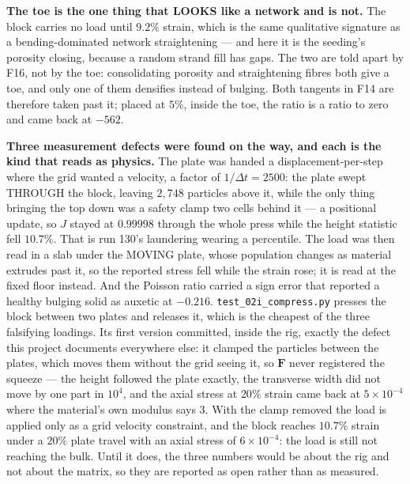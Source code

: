 \documentclass[10pt,a4paper]{article}
\newcommand{\op}[1]{\texttt{#1}}
\begin{document}
\textbf{The toe is the one thing that LOOKS like a network and is not.} The block carries no load
until $9.2\%$ strain, which is the same qualitative signature as a bending-dominated network
straightening --- and here it is the seeding's porosity closing, because a random strand fill has gaps.
The two are told apart by F16, not by the toe: consolidating porosity and straightening fibres both
give a toe, and only one of them densifies instead of bulging. Both tangents in F14 are therefore
taken past it; placed at $5\%$, inside the toe, the ratio is a ratio to zero and came back at $-562$.

\textbf{Three measurement defects were found on the way, and each is the kind that reads as physics.}
The plate was handed a displacement-per-step where the grid wanted a velocity, a factor of
$1/\Delta t=2500$: the plate swept THROUGH the block, leaving $2{,}748$ particles above it, while the
only thing bringing the top down was a safety clamp two cells behind it --- a positional update, so
$J$ stayed at $0.99998$ through the whole press while the height statistic fell $10.7\%$. That is run
130's laundering wearing a percentile. The load was then read in a slab under the MOVING plate, whose
population changes as material extrudes past it, so the reported stress fell while the strain rose;
it is read at the fixed floor instead. And the Poisson ratio carried a sign error that reported a
healthy bulging solid as auxetic at $-0.216$. \op{test\_02i\_compress.py} presses the
block between two plates and releases it, which is the cheapest of the three falsifying loadings. Its
first version committed, inside the rig, exactly the defect this project documents everywhere else: it
clamped the particles between the plates, which moves them without the grid seeing it, so $\mathbf F$
never registered the squeeze --- the height followed the plate exactly, the transverse width did not
move by one part in $10^4$, and the axial stress at $20\%$ strain came back at $5\times10^{-4}$ where
the material's own modulus says $3$. With the clamp removed the load is applied only as a grid velocity
constraint, and the block reaches $10.7\%$ strain under a $20\%$ plate travel with an axial stress of
$6\times10^{-4}$: the load is still not reaching the bulk. Until it does, the three numbers would be
about the rig and not about the matrix, so they are reported as open rather than as measured.
\end{document}
